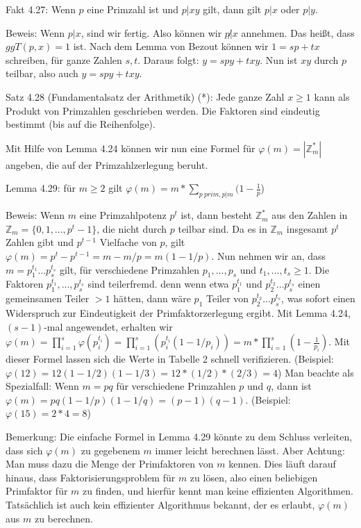 \documentclass[a4paper]{article}
\begin{document}
\begin{multicols}{3}
    Fakt 4.27: Wenn $p$ eine Primzahl ist und $p|xy$ gilt, dann gilt $p|x$ oder $p|y$.

    Beweis: Wenn $p|x$, sind wir fertig. Also können wir $p\not|x$ annehmen. Das heißt, dass $ggT(p,x) = 1$ ist. Nach dem Lemma von Bezout können wir $1 =sp+tx$ schreiben, für ganze Zahlen $s,t$. Daraus folgt: $y=spy+txy$. Nun ist $xy$ durch $p$ teilbar, also auch $y=spy+txy$.

    Satz 4.28 (Fundamentalsatz der Arithmetik) (*): Jede ganze Zahl $x\geq 1$ kann als Produkt von Primzahlen geschrieben werden. Die Faktoren sind eindeutig bestimmt (bis auf die Reihenfolge).

    Mit Hilfe von Lemma 4.24 können wir nun eine Formel für $\varphi(m) =|\mathbb{Z}^*_m|$ angeben, die auf der Primzahlzerlegung beruht.

    Lemma 4.29: für $m\geq 2$ gilt $\varphi(m)=m*\sum_{p\ prim, p|m} (1-\frac{1}{p}$)

        Beweis: Wenn $m$ eine Primzahlpotenz $p^t$ ist, dann besteht $\mathbb{Z}^*_m$ aus den Zahlen in $\mathbb{Z}_m=\{0,1,...,p^t-1\}$, die nicht durch $p$ teilbar sind. Da es in $\mathbb{Z}_m$ insgesamt $p^t$ Zahlen gibt und $p^{t-1}$ Vielfache von $p$, gilt $\varphi(m)=p^t-p^{t-1} =m-m/p=m(1-1/p)$. Nun nehmen wir an, dass $m=p^{t_1}_1 ...p^{t_s}_s$ gilt, für verschiedene Primzahlen $p_1,...,p_s$ und $t_1,...,t_s\geq 1$. Die Faktoren $p^{t_1}_1,...,p^{t_s}_s$ sind teilerfremd. denn wenn etwa $p^{t_1}_1$ und $p^{t_2}_2...p^{t_s}_s$ einen gemeinsamen Teiler $>1$ hätten, dann wäre $p_1$ Teiler von $p^{t_2}_2...p^{t_s}_s$, was sofort einen Widerspruch zur Eindeutigkeit der Primfaktorzerlegung ergibt. Mit Lemma 4.24, $(s-1)$-mal angewendet, erhalten wir $\varphi(m) =\prod^s_{i=1} \varphi(p^{t_i}_i) = \prod^s_{i=1} (p^{t_i}_i (1-1/p_i)) =m* \prod^s_{i=1} (1-\frac{1}{p_i})$.
        Mit dieser Formel lassen sich die Werte in Tabelle 2 schnell verifizieren. (Beispiel: $\varphi(12) = 12(1-1/2)(1-1/3) = 12*(1/2)*(2/3) = 4$) Man beachte als Spezialfall: Wenn $m=pq$ für verschiedene Primzahlen $p$ und $q$, dann ist $\varphi(m)=pq(1-1/p)(1-1/q) =(p-1)(q-1)$. (Beispiel: $\varphi(15) =2*4=8$)

        Bemerkung: Die einfache Formel in Lemma 4.29 könnte zu dem Schluss verleiten, dass sich $\varphi(m)$ zu gegebenem $m$ immer leicht berechnen lässt. Aber Achtung: Man muss dazu die Menge der Primfaktoren von $m$ kennen. Dies läuft darauf hinaus, dass Faktorisierungsproblem für $m$ zu lösen, also einen beliebigen Primfaktor für $m$ zu finden, und hierfür kennt man keine effizienten Algorithmen. Tatsächlich ist auch
        kein effizienter Algorithmus bekannt, der es erlaubt, $\varphi(m)$ aus $m$ zu berechnen.


\end{multicols}
\end{document}
